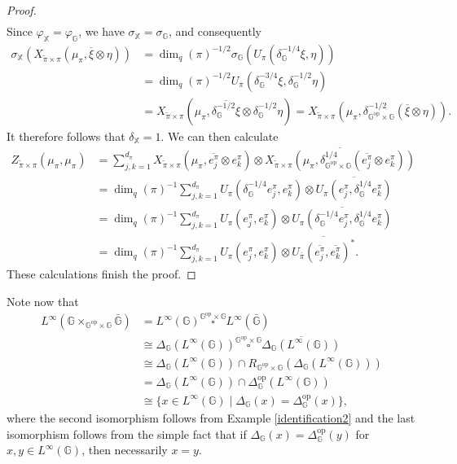 \documentclass[reqno]{amsart}
\numberwithin{equation}{section}
\newcommand{\op}{\mathrm{op}}
\newcommand{\G}{\mathbb{G}}
\newcommand{\X}{\mathbb{X}}
\begin{document}
\begin{proof}
\begin{align*}
\end{align*}
Since $\varphi_\X= \varphi_\G$, we have $\sigma_\X= \sigma_\G$, and consequently
\begin{align*}
    \sigma_\X(X_{\tilde{\pi}\times \pi}(\mu_\pi, \overline{\xi}\otimes \eta))&= \dim_q(\pi)^{-1/2}\sigma_\G(U_\pi(\delta_\G^{-1/4}\xi, \eta))\\
    &= \dim_q(\pi)^{-1/2}U_\pi(\delta_\G^{-3/4}\xi, \delta_\G^{-1/2}\eta)\\
    &= X_{\tilde{\pi}\times \pi}(\mu_\pi, \overline{\delta_\G^{-1/2}\xi} \otimes \delta_\G^{-1/2}\eta)= X_{\tilde{\pi}\times \pi}(\mu_\pi, \delta_{\G^{\op}\times \G}^{-1/2}(\overline{\xi}\otimes \eta)).
\end{align*}
It therefore follows that $\delta_\X = 1$. We can then calculate
\begin{align*}
    Z_{\tilde{\pi}\times \pi} (\mu_\pi, \mu_\pi)&= \sum_{j,k=1}^{d_\pi} X_{\tilde{\pi}\times\pi}(\mu_\pi, \overline{e_j^\pi}\otimes e_k^\pi)\otimes \overline{X_{\tilde{\pi}\times \pi}(\mu_\pi, \delta_{\G^{\op}\times \G}^{1/4}(\overline{e_j^\pi}\otimes e_k^\pi))}\\
    &= \dim_q(\pi)^{-1} \sum_{j,k=1}^{d_\pi} U_\pi(\delta_\G^{-1/4}e_j^\pi, e_k^\pi)\otimes \overline{U_\pi(e_j^\pi, \delta_\G^{1/4}e_k^\pi)}\\
    &= \dim_q(\pi)^{-1}\sum_{j,k=1}^{d_\pi} U_\pi(e_j^\pi, e_k^\pi) \otimes \overline{U_\pi(\delta_\G^{-1/4}e_j^\pi, \delta_\G^{1/4}e_k^\pi)}\\
    &= \dim_q(\pi)^{-1} \sum_{j,k=1}^{d_\pi} U_\pi(e_j^\pi, e_k^\pi)\otimes \overline{U_{\bar{\pi}}(\overline{e_j^\pi}, \overline{e_k^\pi})^*}.
\end{align*}
These calculations finish the proof.
\end{proof} 

Note now that
\begin{align*}
    L^\infty(\G\times_{\G^{\op}\times \G}\bar{\G})&= L^\infty(\G)\stackrel{\G^{\op}\times \G}\square L^\infty(\bar{\G})\\
    &\cong \Delta_\G(L^\infty(\G))\stackrel{\G^{\op}\times \G}\square \overline{\Delta_\G(L^\infty(\G))}\\
    &\cong \Delta_\G(L^\infty(\G))\cap R_{\G^{\op}\times \G}(\Delta_\G(L^\infty(\G)))\\
&= \Delta_\G(L^\infty(\G))\cap \Delta_\G^{\op}(L^\infty(\G)) \\
&\cong \{x\in L^\infty(\G)\mid \Delta_\G(x)= \Delta_\G^{\op}(x)\},
\end{align*}
where the second isomorphism follows from Example \ref{identification2} and the last isomorphism follows from the simple fact that if $\Delta_\G(x)= \Delta_\G^{\op}(y)$ for $x,y \in L^\infty(\G)$, then necessarily $x=y$.
\end{document}
